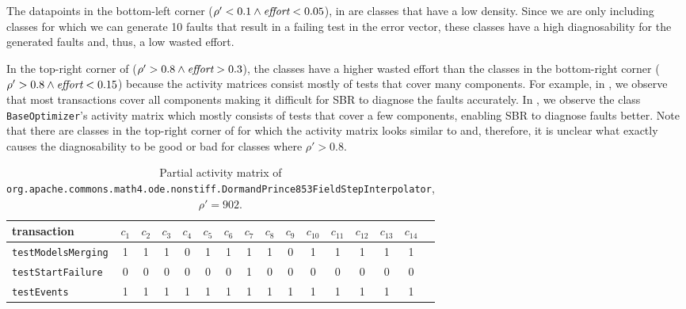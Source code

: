 \documentclass[twoside,a4paper,11pt]{memoir}
\begin{document}
The datapoints in the bottom-left corner (\(\rho' < 0.1 \wedge \emph{effort} < 0.05\)), in  are classes that have a low density.
Since we are only including classes for which we can generate 10 faults that result in a failing test in the error vector, these classes have a high diagnosability for the generated faults and, thus, a low wasted effort.

In the top-right corner of  (\(\rho' > 0.8 \wedge \emph{effort} > 0.3 \)), the classes have a higher wasted effort than the classes in the bottom-right corner (\(\rho' > 0.8 \wedge \emph{effort} < 0.15 \)) because the activity matrices consist mostly of tests that cover many components.
For example, in , we observe that most transactions cover all components making it difficult for SBR to diagnose the faults accurately.
In , we observe the class \texttt{BaseOptimizer}'s activity matrix which mostly consists of tests that cover a few components, enabling SBR to diagnose faults better.
Note that there are classes in the top-right corner of  for which the activity matrix looks similar to  and, therefore, it is unclear what exactly causes the diagnosability to be good or bad for classes where \(\rho' > 0.8\).
 
\begin{table}[]
    \scriptsize
    \centering
    \caption{Partial activity matrix of \texttt{org.\-apache.\-commons.\-math4.\-ode.\-nonstiff.\-Dormand\-Prince853\-Field\-Step\-Interpolator}, \(\rho' = 902 \).}%
    \label{tab:dormandprince}
    \begin{adjustbox}{center}
    \begin{tabular}{l|ccccccccccccccc}
    transaction & \(c_1 \) & \(c_2 \) & \(c_3 \) & \(c_4 \) & \(c_5 \) & \(c_6 \) & \(c_7 \) & \(c_8 \) & \(c_9 \) & \(c_{10} \) & \(c_{11} \) & \(c_{12} \) & \(c_{13} \) & \(c_{14} \) \\ \hline
    \texttt{testModelsMerging} & 1 & 1 & 1 & 0 & 1 & 1 & 1 & 1 & 0 & 1 & 1 & 1 & 1 & 1 \\
    \texttt{testStartFailure} & 0 & 0 & 0 & 0 & 0 & 0 & 1 & 0 & 0 & 0 & 0 & 0 & 0 & 0 \\
    \texttt{testEvents} & 1 & 1 & 1 & 1 & 1 & 1 & 1 & 1 & 1 & 1 & 1 & 1 & 1 & 1 \\
    \end{tabular}
    \end{adjustbox}
\end{table}
\end{document}
